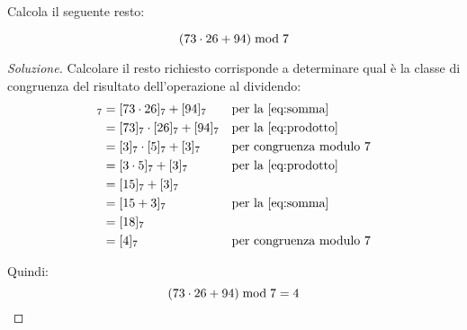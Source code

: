 \begin{mdframed}
    \begin{esercizio}
        Calcola il seguente resto:

        \begin{equation*}
            (73 \cdot 26 + 94)  \bmod  7
        \end{equation*}
    \end{esercizio}    
    \begin{proof}[Soluzione]
        Calcolare il resto richiesto corrisponde a determinare qual è la classe di congruenza del risultato dell'operazione al dividendo:
        \begin{align*}
            [73 \cdot 26 + 94]_7 &= [73 \cdot 26]_7 + [94]_7 &&\text{per la~\eqref{eq:somma}} \\
            &= [73]_7 \cdot [26]_7 + [94]_7 &&\text{per la~\eqref{eq:prodotto}} \\
            &= [3]_7 \cdot [5]_7 + [3]_7 &&\text{per congruenza modulo 7} \\
            &= [3 \cdot 5]_7 + [3]_7 &&\text{per la~\eqref{eq:prodotto}} \\
            &= [15]_7 + [3]_7 \\
            &= [15 + 3]_7 &&\text{per la~\eqref{eq:somma}} \\
            &= [18]_7 \\
            &= [4]_7 &&\text{per congruenza modulo 7}
        \end{align*}

        Quindi:
        \begin{equation*}
            (73 \cdot 26 + 94)  \bmod  7 = 4
        \end{equation*}
    \end{proof}
\end{mdframed}
